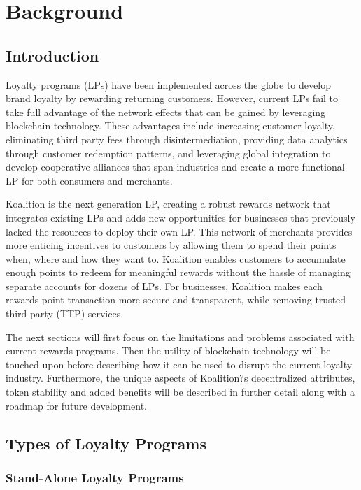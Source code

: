 \section{Background} \label{sec:background}

\subsection{Introduction}
Loyalty programs (LPs) have been implemented across the globe to develop brand loyalty by rewarding returning customers. However, current LPs fail to take full advantage of the network effects that can be gained by leveraging blockchain technology. These advantages include increasing customer loyalty, eliminating third party fees through disintermediation, providing data analytics through customer redemption patterns, and leveraging global integration to develop cooperative alliances that span industries and create a more functional LP for both consumers and merchants. 

Koalition is the next generation LP, creating a robust rewards network that integrates existing LPs and adds new opportunities for businesses that previously lacked the resources to deploy their own LP. This network of merchants provides more enticing incentives to customers by allowing them to spend their points when, where and how they want to.  Koalition enables customers to accumulate enough points to redeem for meaningful rewards without the hassle of managing separate accounts for dozens of LPs. For businesses, Koalition makes each rewards point transaction more secure and transparent, while removing trusted third party (TTP) services.

The next sections will first focus on the limitations and problems associated with current rewards programs. Then the utility of blockchain technology will be touched upon before describing how it can be used to disrupt the current loyalty industry. Furthermore, the unique aspects of Koalition?s decentralized attributes, token stability and added benefits will be described in further detail along with a roadmap for future development. 

\subsection{Types of Loyalty Programs}

\subsubsection{Stand-Alone Loyalty Programs}

